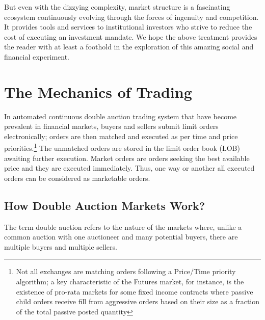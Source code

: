 But even with the dizzying complexity, market structure is a fascinating ecosystem continuously evolving through the forces of ingenuity and competition. It provides tools and services to institutional investors who strive to reduce the cost of executing an investment mandate. We hope the above treatment provides the reader with at least a foothold in the exploration of this amazing social and financial experiment.

\section{The Mechanics of Trading}



In automated continuous double auction trading system that have become prevalent in financial markets, buyers and sellers submit limit orders electronically; orders are then matched and executed as per time and price priorities.\footnote{Not all exchanges are matching orders following a Price/Time priority algorithm; a key characteristic of the Futures market, for instance, is the existence of pro-rata markets for some fixed income contracts where passive child orders receive fill from aggressive orders based on their size as a fraction of the total passive posted quantity} The unmatched orders are stored in the limit order book (LOB) awaiting further execution. Market orders are orders seeking the best available price and they are executed immediately. Thus, one way or another all executed orders can be considered as marketable orders.




\subsection{How Double Auction Markets Work?}



The term double auction refers to the nature of the markets where, unlike a common auction with one auctioneer and many potential buyers, there are multiple buyers and multiple sellers. \\



